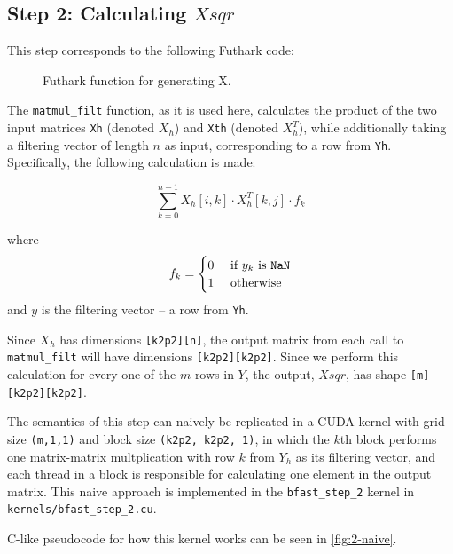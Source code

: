 \subsection{
  Step 2: Calculating \(Xsqr\)
}
This step corresponds to the following Futhark code:
\begin{figure}[H]
    \centering
    \caption{Futhark function for generating X.}
    \label{fut:kernel2}
\end{figure}

The \texttt{matmul\_filt} function, as it is used here, calculates the product
of the two input matrices \texttt{Xh} (denoted \(X_h\)) and \texttt{Xth}
(denoted \(X^T_h\)), while additionally taking a filtering vector of length
\(n\) as input, corresponding to a row from \texttt{Yh}.
Specifically, the following calculation is made:

\[
  \sum\limits_{k=0}^{n-1} X_h[i,k]\cdot X_h^T[k,j]\cdot f_k
\]

where
\[
  f_k =
  \begin{cases}
    0 & \mbox{ if } y_k \mbox{ is \texttt{NaN}} \\
    1 & \mbox{ otherwise }
  \end{cases}
\]
and \(y\) is the filtering vector -- a row from \texttt{Yh}.

Since \(X_h\) has dimensions \texttt{[k2p2][n]}, the output matrix from each call
to \texttt{matmul\_filt} will have dimensions \texttt{[k2p2][k2p2]}.
Since we perform this calculation for every one of the \(m\) rows in \(Y\), the
output, \(Xsqr\), has shape \texttt{[m][k2p2][k2p2]}.

The semantics of this step can naively be replicated in a CUDA-kernel with grid
size \texttt{(m,1,1)} and block size \texttt{(k2p2, k2p2, 1)}, in which the
\(k\)th block performs one matrix-matrix multplication with row \(k\) from
\(Y_h\) as its filtering vector, and each thread in a block is responsible for
calculating one element in the output matrix.
This naive approach is implemented in the \texttt{bfast\_step\_2} kernel in
\texttt{kernels/bfast\_step\_2.cu}.

C-like pseudocode for how this kernel works can be seen in
\autoref{fig:2-naive}.

